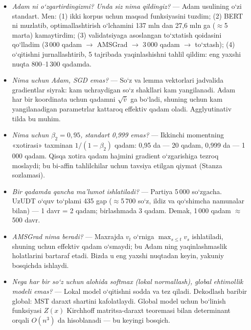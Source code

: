 \documentclass[14pt,a4paper]{extarticle}
\begin{document}
\begin{itemize}
        ko‘p sikl hosil qiladi, ya’ni bu og‘ir holat. O‘qitilgan model vaznlari aniqroq, sikllar
        kamroq --- vaqt bundan ham kichik. To‘liq saralash vaqti esa vaznlarga bog‘liq emas, faqat $n$ ga.
  \item \textit{Adam ni o‘zgartirdingizmi? Unda siz nima qildingiz?} --- Adam usulining o‘zi standart.
        Men: (1) ikki korpus uchun maqsad funksiyasini tuzdim; (2) BERT ni muzlatib, optimallashtirish
        o‘lchamini 137 mln dan 27,6 mln ga ($\approx$5 marta) kamaytirdim; (3) validatsiyaga asoslangan
        to‘xtatish qoidasini qo‘lladim (3\,000 qadam $\to$ AMSGrad $\to$ 3\,000 qadam $\to$ to‘xtash);
        (4) o‘qitishni jurnallashtirib, 5 tajribada yaqinlashishni tahlil qildim: eng yaxshi nuqta
        800--1\,300 qadamda.
  \item \textit{Nima uchun Adam, SGD emas?} --- So‘z va lemma vektorlari jadvalida gradientlar siyrak:
        kam uchraydigan so‘z shakllari kam yangilanadi. Adam har bir koordinata uchun qadamni
        $\sqrt{\hat v}$ ga bo‘ladi, shuning uchun kam yangilanadigan parametrlar kattaroq effektiv qadam
        oladi. Agglyutinativ tilda bu muhim.
  \item \textit{Nima uchun $\beta_2=0{,}95$, standart 0,999 emas?} --- Ikkinchi momentning «xotirasi»
        taxminan $1/(1-\beta_2)$ qadam: 0,95 da --- 20 qadam, 0,999 da --- 1\,000 qadam. Qisqa xotira
        qadam hajmini gradient o‘zgarishiga tezroq moslaydi; bu bi-affin tahlilchilar uchun tavsiya
        etilgan qiymat (Stanza sozlamasi).
  \item \textit{Bir qadamda qancha ma’lumot ishlatiladi?} --- Partiya 5\,000 so‘zgacha. UzUDT o‘quv
        to‘plami 435 gap ($\approx$5\,700 so‘z, ildiz va qo‘shimcha namunalar bilan) --- 1 davr = 2 qadam;
        birlashmada 3 qadam. Demak, 1\,000 qadam $\approx$ 500 davr.
  \item \textit{AMSGrad nima beradi?} --- Maxrajda $v_t$ o‘rniga $\max_{s\le t}v_s$ ishlatiladi, shuning
        uchun effektiv qadam o‘smaydi; bu Adam ning yaqinlashmaslik holatlarini bartaraf etadi. Bizda u
        eng yaxshi nuqtadan keyin, yakuniy bosqichda ishlaydi.
  \item \textit{Nega har bir so‘z uchun alohida softmax (lokal normallash), global ehtimollik
        modeli emas?} --- Lokal model o‘qitishni sodda va tez qiladi. Dekodlash baribir global: MST
        daraxt shartini kafolatlaydi. Global model uchun bo‘linish funksiyasi $Z(x)$ Kirchhoff
        matritsa-daraxt teoremasi bilan determinant orqali $O(n^3)$ da hisoblanadi --- bu keyingi bosqich.

\end{itemize}
\end{document}
